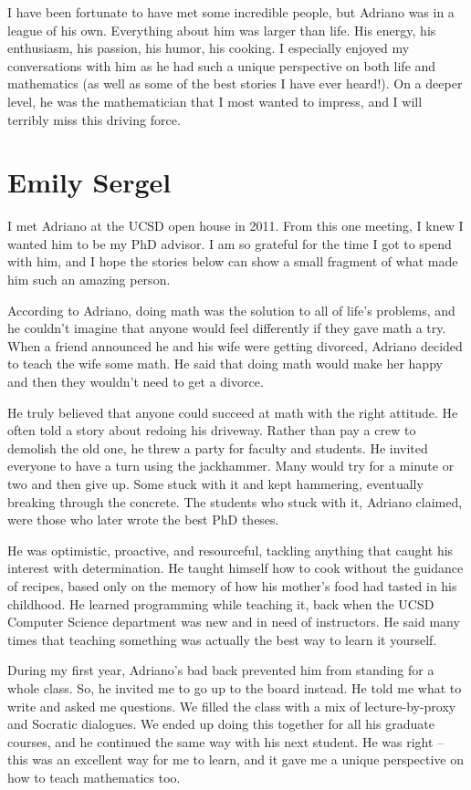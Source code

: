 \documentclass{notices}
\begin{document}
I have been fortunate to have met some incredible people, but Adriano was in a league of his own. Everything about him was larger than life. His energy, his enthusiasm, his passion, his humor, his cooking. I especially enjoyed my conversations with him as he had such a unique perspective  on both life and  mathematics (as well as some of the best stories I have ever heard!). On a deeper level, he was the mathematician that I most wanted to impress, and I will terribly miss this driving force.

\section*{Emily Sergel}
I met Adriano at the UCSD open house in 2011. From this one meeting, I knew I wanted him to be my PhD advisor. I am so grateful for the time I got to spend with him, and I hope the stories below can show a small fragment of what made him such an amazing person.

According to Adriano, doing math was the solution to all of life's problems, and he couldn't imagine that anyone would feel differently if they gave math a try. When a friend announced he and his wife were getting divorced, Adriano decided to teach the wife some math. He said that doing math would make her happy and then they wouldn't need to get a divorce.

He truly believed that anyone could succeed at math with the right attitude. He often told a story about redoing his driveway. Rather than pay a crew to demolish the old one, he threw a party for faculty and students. He invited everyone to have a turn using the jackhammer. Many would try for a minute or two and then give up. Some stuck with it and kept hammering, eventually breaking through the concrete. The students who stuck with it, Adriano claimed, were those who later wrote the best PhD theses.

He was optimistic, proactive, and resourceful, tackling anything that caught his interest with determination. He taught himself how to cook without the guidance of recipes, based only on the memory of how his mother's food had tasted in his childhood. He learned programming while teaching it, back when the UCSD Computer Science department was new and in need of instructors. He said many times that teaching something was actually the best way to learn it yourself.

During my first year, Adriano's bad back prevented him from standing for a whole class. So, he invited me to go up to the board instead. He told me what to write and asked me questions. We filled the class with a mix of lecture-by-proxy and Socratic dialogues. We ended up doing this together for all his graduate courses, and he continued the same way with his next student. He was right – this was an excellent way for me to learn, and it gave me a unique perspective on how to teach mathematics too.
\end{document}
